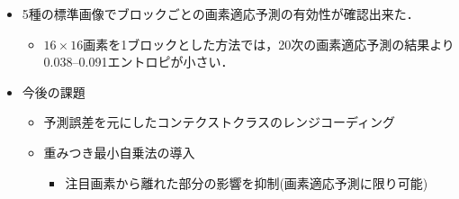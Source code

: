 \documentclass[25pt,landscape,dvipdfmx,uplatex]{foils}
\begin{document}

 \begin{itemize}
  \item {\large } 5種の標準画像でブロックごとの画素適応予測の有効性が確認出来た．
  \begin{itemize}
   \item $16\times16$画素を1ブロックとした方法では，20次の画素適応予測の結果より0.038--0.091エントロピが小さい．
  \end{itemize}
  \item 今後の課題
  \begin{itemize}
   \item 予測誤差を元にしたコンテクストクラスのレンジコーディング
   \item 重みつき最小自乗法の導入
   \begin{itemize}
    \item 注目画素から離れた部分の影響を抑制(画素適応予測に限り可能)
   \end{itemize}
  \end{itemize}
 \end{itemize}
\end{document}
